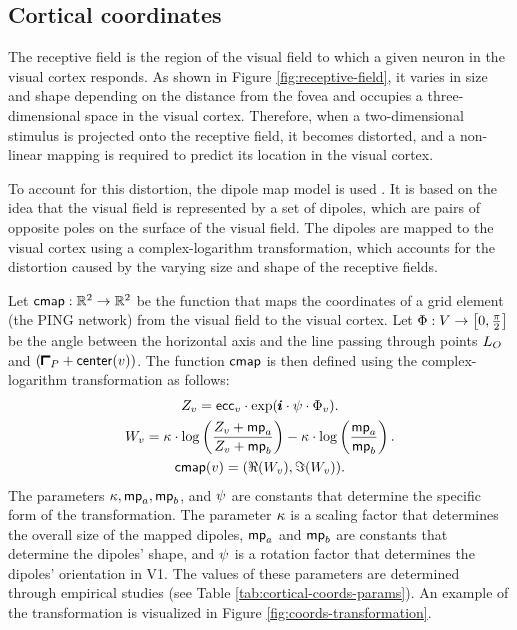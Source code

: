 \subsection{Cortical coordinates}
\label{sec:cortical-coords}

The receptive field is the region of the visual field to which a given neuron in the visual cortex responds. As shown in Figure \ref{fig:receptive-field}, it varies in size and shape depending on the distance from the fovea and occupies a three-dimensional space in the visual cortex. Therefore, when a two-dimensional stimulus is projected onto the receptive field, it becomes distorted, and a non-linear mapping is required to predict its location in the visual cortex.

To account for this distortion, the dipole map model is used \cite{Schwartz1980, Polimeni2006}. It is based on the idea that the visual field is represented by a set of dipoles, which are pairs of opposite poles on the surface of the visual field. The dipoles are mapped to the visual cortex using a complex-logarithm transformation, which accounts for the distortion caused by the varying size and shape of the receptive fields.

Let $\mathsf{cmap}: \mathbb{R}^2 \to \mathbb{R}^2$ be the function that maps the coordinates of a grid element (the PING network) from the visual field to the visual cortex. Let $\Phi: V \to \left[ 0, \frac{\pi}{2} \right]$ be the angle between the horizontal axis and the line passing through points $L_O$ and $(\patchstart + \centr(v))$. The function $\mathsf{cmap}$ is then defined using the complex-logarithm transformation as follows:
\begin{equation}
\begin{gathered}
    Z_v = \mathsf{ecc}_v \cdot \exp(\pmb{i} \cdot \psi \cdot \Phi_v). 
    \\
    W_v = \kappa \cdot \log \left( 
        \frac{Z_v + \mathsf{mp}_a}{Z_v + \mathsf{mp}_b}
    \right) - \kappa \cdot \log \left( 
        \frac{\mathsf{mp}_a}{\mathsf{mp}_b}
    \right).
    \\
    \mathsf{cmap}(v) = (\Re(W_v), \Im(W_v)).
\end{gathered}
\end{equation}
The parameters $\kappa, \mathsf{mp}_a, \mathsf{mp}_b$, and $\psi$ are constants that determine the specific form of the transformation. 
The parameter $\kappa$ is a scaling factor that determines the overall size of the mapped dipoles, $\mathsf{mp}_a$ and $\mathsf{mp}_b$ are constants that determine the dipoles' shape, and $\psi$ is a rotation factor that determines the dipoles' orientation in V1.
The values of these parameters are determined through empirical studies (see Table \ref{tab:cortical-coords-params}).
An example of the transformation is visualized in Figure \ref{fig:coords-transformation}.

